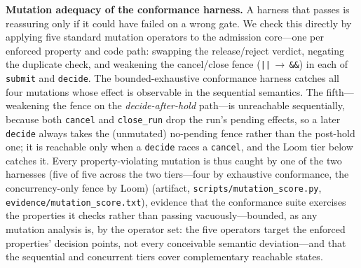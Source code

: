 \documentclass[10pt,journal,compsoc]{IEEEtran}
\begin{document}
\smallskip\noindent\textbf{Mutation adequacy of the conformance harness.}
A harness that passes is reassuring only if it could have failed on a wrong
gate. We check this directly by applying five standard mutation operators to the
admission core---one per enforced property and code path: swapping the
release/reject verdict, negating the duplicate check, and weakening the
cancel/close fence (\texttt{||}\,$\to$\,\texttt{\&\&}) in each of \texttt{submit}
and \texttt{decide}. The bounded-exhaustive conformance harness catches all four
mutations whose effect is observable in the sequential semantics. The
fifth---weakening the fence on the \emph{decide-after-hold} path---is unreachable
sequentially, because both \texttt{cancel} and \texttt{close\_run} drop the run's
pending effects, so a later \texttt{decide} always takes the (unmutated)
no-pending fence rather than the post-hold one; it is reachable only when a
\texttt{decide} races a \texttt{cancel}, and the Loom tier below catches it.
Every property-violating mutation is thus caught by one of the two harnesses
(five of five across the two tiers---four by exhaustive conformance, the
concurrency-only fence by Loom)
(artifact, \texttt{scripts/mutation\_score.py},
\texttt{evidence/mutation\_score.txt}), evidence that the conformance suite
exercises the properties it checks rather than passing vacuously---bounded, as
any mutation analysis is, by the operator set: the five operators target the
enforced properties' decision points, not every conceivable semantic
deviation---and that the
sequential and concurrent tiers cover complementary reachable states.
\end{document}
